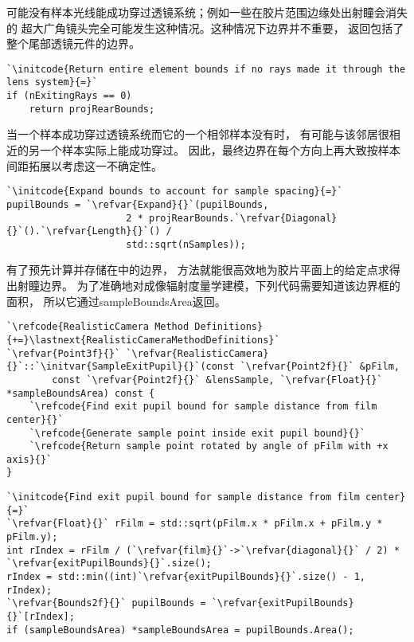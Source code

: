 可能没有样本光线能成功穿过透镜系统；例如一些在胶片范围边缘处出射瞳会消失的
超大广角镜头完全可能发生这种情况。这种情况下边界并不重要，
返回包括了整个尾部透镜元件的边界。
\begin{lstlisting}
`\initcode{Return entire element bounds if no rays made it through the lens system}{=}`
if (nExitingRays == 0) 
    return projRearBounds;
\end{lstlisting}

当一个样本成功穿过透镜系统而它的一个相邻样本没有时，
有可能与该邻居很相近的另一个样本实际上能成功穿过。
因此，最终边界在每个方向上再大致按样本间距拓展以考虑这一不确定性。
\begin{lstlisting}
`\initcode{Expand bounds to account for sample spacing}{=}`
pupilBounds = `\refvar{Expand}{}`(pupilBounds,
                     2 * projRearBounds.`\refvar{Diagonal}{}`().`\refvar{Length}{}`() /
                     std::sqrt(nSamples));
\end{lstlisting}

有了预先计算并存储在中的边界，
方法就能很高效地为胶片平面上的给定点求得出射瞳边界。
为了准确地对成像辐射度量学建模，下列代码需要知道该边界框的面积，
所以它通过{\ttfamily sampleBoundsArea}返回。
\begin{lstlisting}
`\refcode{RealisticCamera Method Definitions}{+=}\lastnext{RealisticCameraMethodDefinitions}` 
`\refvar{Point3f}{}` `\refvar{RealisticCamera}{}`::`\initvar{SampleExitPupil}{}`(const `\refvar{Point2f}{}` &pFilm,
        const `\refvar{Point2f}{}` &lensSample, `\refvar{Float}{}` *sampleBoundsArea) const {
    `\refcode{Find exit pupil bound for sample distance from film center}{}`
    `\refcode{Generate sample point inside exit pupil bound}{}`
    `\refcode{Return sample point rotated by angle of pFilm with +x axis}{}`
}
\end{lstlisting}
\begin{lstlisting}
`\initcode{Find exit pupil bound for sample distance from film center}{=}`
`\refvar{Float}{}` rFilm = std::sqrt(pFilm.x * pFilm.x + pFilm.y * pFilm.y);
int rIndex = rFilm / (`\refvar{film}{}`->`\refvar{diagonal}{}` / 2) * `\refvar{exitPupilBounds}{}`.size();
rIndex = std::min((int)`\refvar{exitPupilBounds}{}`.size() - 1, rIndex);
`\refvar{Bounds2f}{}` pupilBounds = `\refvar{exitPupilBounds}{}`[rIndex];
if (sampleBoundsArea) *sampleBoundsArea = pupilBounds.Area();
\end{lstlisting}

